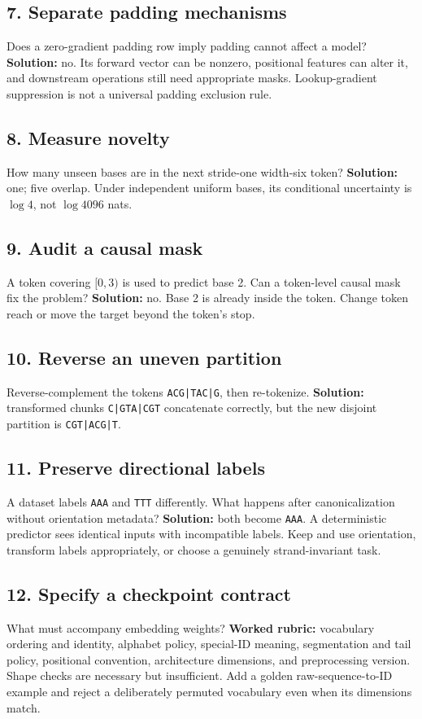 \subsection*{7. Separate padding mechanisms}
Does a zero-gradient padding row imply padding cannot affect a model?
\textbf{Solution:} no. Its forward vector can be nonzero, positional features
can alter it, and downstream operations still need appropriate masks.
Lookup-gradient suppression is not a universal padding exclusion rule.

\subsection*{8. Measure novelty}
How many unseen bases are in the next stride-one width-six token?
\textbf{Solution:} one; five overlap. Under independent uniform bases,
its conditional uncertainty is $\log4$, not $\log4096$ nats.

\subsection*{9. Audit a causal mask}
A token covering $[0,3)$ is used to predict base 2. Can a token-level
causal mask fix the problem? \textbf{Solution:} no. Base 2 is already inside
the token. Change token reach or move the target beyond the token's stop.

\subsection*{10. Reverse an uneven partition}
Reverse-complement the tokens \texttt{ACG|TAC|G}, then re-tokenize.
\textbf{Solution:} transformed chunks \texttt{C|GTA|CGT} concatenate
correctly, but the new disjoint partition is \texttt{CGT|ACG|T}.

\subsection*{11. Preserve directional labels}
A dataset labels \texttt{AAA} and \texttt{TTT} differently. What happens
after canonicalization without orientation metadata?
\textbf{Solution:} both become \texttt{AAA}. A deterministic predictor sees
identical inputs with incompatible labels. Keep and use orientation, transform
labels appropriately, or choose a genuinely strand-invariant task.

\subsection*{12. Specify a checkpoint contract}
What must accompany embedding weights?
\textbf{Worked rubric:} vocabulary ordering and identity, alphabet policy,
special-ID meaning, segmentation and tail policy, positional convention,
architecture dimensions, and preprocessing version. Shape checks are necessary
but insufficient. Add a golden raw-sequence-to-ID example and reject a
deliberately permuted vocabulary even when its dimensions match.
